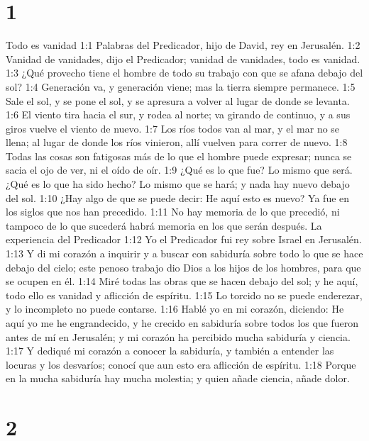 
\chapter{1}

Todo es vanidad  
1:1 Palabras del Predicador, hijo de David, rey en Jerusalén. 
1:2 Vanidad de vanidades, dijo el Predicador; vanidad de vanidades, todo es vanidad.  
1:3 ¿Qué provecho tiene el hombre de todo su trabajo con que se afana debajo del sol?  
1:4 Generación va, y generación viene; mas la tierra siempre permanece.  
1:5 Sale el sol, y se pone el sol, y se apresura a volver al lugar de donde se levanta.  
1:6 El viento tira hacia el sur, y rodea al norte; va girando de continuo, y a sus giros vuelve el viento de nuevo.  
1:7 Los ríos todos van al mar, y el mar no se llena; al lugar de donde los ríos vinieron, allí vuelven para correr de nuevo.  
1:8 Todas las cosas son fatigosas más de lo que el hombre puede expresar; nunca se sacia el ojo de ver, ni el oído de oír.  
1:9 ¿Qué es lo que fue? Lo mismo que será. ¿Qué es lo que ha sido hecho? Lo mismo que se hará; y nada hay nuevo debajo del sol.  
1:10 ¿Hay algo de que se puede decir: He aquí esto es nuevo? Ya fue en los siglos que nos han precedido.  
1:11 No hay memoria de lo que precedió, ni tampoco de lo que sucederá habrá memoria en los que serán después.  
La experiencia del Predicador  
1:12 Yo el Predicador fui rey sobre Israel en Jerusalén.  
1:13 Y di mi corazón a inquirir y a buscar con sabiduría sobre todo lo que se hace debajo del cielo; este penoso trabajo dio Dios a los hijos de los hombres, para que se ocupen en él.  
1:14 Miré todas las obras que se hacen debajo del sol; y he aquí, todo ello es vanidad y aflicción de espíritu.  
1:15 Lo torcido no se puede enderezar, y lo incompleto no puede contarse. 
1:16 Hablé yo en mi corazón, diciendo: He aquí yo me he engrandecido, y he crecido en sabiduría sobre todos los que fueron antes de mí en Jerusalén; y mi corazón ha percibido mucha sabiduría y ciencia.  
1:17 Y dediqué mi corazón a conocer la sabiduría, y también a entender las locuras y los desvaríos; conocí que aun esto era aflicción de espíritu.  
1:18 Porque en la mucha sabiduría hay mucha molestia; y quien añade ciencia, añade dolor.  

\chapter{2}


